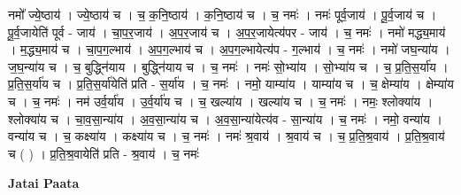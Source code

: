 \documentclass[17pt]{extarticle}
\begin{document}
नमो᳚ ज्ये॒ष्ठाय॑ । ज्ये॒ष्ठाय॑ च । च॒ क॒नि॒ष्ठाय॑ । क॒नि॒ष्ठाय॑ च । च॒ नमः॑ । नमः॑ पूर्व॒जाय॑ । पू॒र्व॒जाय॑ च । पू॒र्व॒जायेति॑ पूर्व - जाय॑ । चा॒प॒र॒जाय॑ । अ॒प॒र॒जाय॑ च । अ॒प॒र॒जायेत्य॑पर - जाय॑ । च॒ नमः॑ । नमो॑ मद्ध्य॒माय॑ । म॒द्ध्य॒माय॑ च । चा॒प॒ग॒ल्भाय॑ । अ॒प॒ग॒ल्भाय॑ च । अ॒प॒ग॒ल्भायेत्य॑प - ग॒ल्भाय॑ । च॒ नमः॑ । नमो॑ जघ॒न्या॑य । ज॒घ॒न्या॑य च । च॒ बुद्ध्नि॑याय । बुद्ध्नि॑याय च । च॒ नमः॑ । नमः॑ सो॒भ्या॑य । सो॒भ्या॑य च । च॒ प्र॒ति॒स॒र्या॑य । प्र॒ति॒स॒र्या॑य च । प्र॒ति॒स॒र्या॑येति॑ प्रति - स॒र्या॑य । च॒ नमः॑ । नमो॒ याम्या॑य । याम्या॑य च । च॒ क्षेम्या॑य । क्षेम्या॑य च । च॒ नमः॑ । नम॑ उर्व॒र्या॑य । उ॒र्व॒र्या॑य च । च॒ खल्या॑य । खल्या॑य च । च॒ नमः॑ । नमः॒ श्लोक्या॑य । श्लोक्या॑य च । चा॒व॒सा॒न्या॑य । अ॒व॒सा॒न्या॑य च । अ॒व॒सा॒न्या॑येत्य॑व - सा॒न्या॑य । च॒ नमः॑ । नमो॒ वन्या॑य । वन्या॑य च । च॒ कक्ष्या॑य । कक्ष्या॑य च । च॒ नमः॑ । नमः॑ श्र॒वाय॑ । श्र॒वाय॑ च । च॒ प्र॒ति॒श्र॒वाय॑ । प्र॒ति॒श्र॒वाय॑ च ( ) । प्र॒ति॒श्र॒वायेति॑ प्रति - श्र॒वाय॑ । च॒ नमः॑ \newline

\textbf{Jatai Paata} \newline
\end{document}
